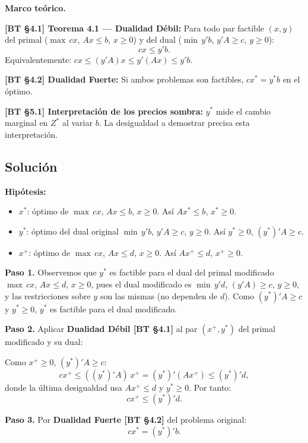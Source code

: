 \documentclass{article}
\newenvironment{marco}{\begin{mdframed}[linecolor=black!40,backgroundcolor=gray!5]\small\textbf{Marco teórico.}\par\smallskip}{\end{mdframed}\medskip}
\begin{document}
\begin{marco}
\textbf{[BT §4.1] Teorema 4.1 — Dualidad Débil:} Para todo par factible $(x, y)$ del primal ($\max\, cx$, $Ax \leq b$, $x \geq 0$) y del dual ($\min\, y'b$, $y'A \geq c$, $y \geq 0$):
\[
  cx \leq y'b.
\]
Equivalentemente: $cx \leq (y'A)x \leq y'(Ax) \leq y'b$.

\textbf{[BT §4.2] Dualidad Fuerte:} Si ambos problemas son factibles, $cx^* = y^* b$ en el óptimo.

\textbf{[BT §5.1] Interpretación de los precios sombra:} $y^*$ mide el cambio marginal en $Z^*$ al variar $b$. La desigualdad a demostrar precisa esta interpretación.
\end{marco}

\subsection*{Solución}

\textbf{Hipótesis:}
\begin{itemize}
  \item $x^*$: óptimo de $\max\, cx$, $Ax \leq b$, $x \geq 0$. Así $Ax^* \leq b$, $x^* \geq 0$.
  \item $y^*$: óptimo del dual original $\min\, y'b$, $y'A \geq c$, $y \geq 0$. Así $y^* \geq 0$, $(y^*)'A \geq c$.
  \item $x^+$: óptimo de $\max\, cx$, $Ax \leq d$, $x \geq 0$. Así $Ax^+ \leq d$, $x^+ \geq 0$.
\end{itemize}

\textbf{Paso 1.} Observemos que $y^*$ es factible para el dual del primal modificado $\max\, cx$, $Ax \leq d$, $x \geq 0$, pues el dual modificado es $\min\, y'd$, $(y'A) \geq c$, $y \geq 0$, y las restricciones sobre $y$ son las mismas (no dependen de $d$). Como $(y^*)'A \geq c$ y $y^* \geq 0$, $y^*$ es factible para el dual modificado.

\textbf{Paso 2.} Aplicar \textbf{Dualidad Débil [BT §4.1]} al par $(x^+, y^*)$ del primal modificado y su dual:

Como $x^+ \geq 0$, $(y^*)'A \geq c$:
\[
  c x^+ \leq ((y^*)'A)\, x^+ = (y^*)'(Ax^+) \leq (y^*)' d,
\]
donde la última desigualdad usa $Ax^+ \leq d$ y $y^* \geq 0$. Por tanto:
\begin{equation}\label{eq:deb}
  cx^+ \leq (y^*)' d. \tag{$*$}
\end{equation}

\textbf{Paso 3.} Por \textbf{Dualidad Fuerte [BT §4.2]} del problema original:
\begin{equation}\label{eq:fuerte}
  cx^* = (y^*)' b. \tag{$**$}
\end{equation}
\end{document}
